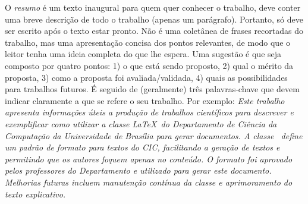 O \emph{resumo} é um texto inaugural para quem quer conhecer o trabalho, deve conter
uma breve descrição de todo o trabalho (apenas um parágrafo). Portanto, só deve
ser escrito após o texto estar pronto. Não é uma coletânea de frases recortadas
do trabalho, mas uma apresentação concisa dos pontos relevantes, de modo que o
leitor tenha uma ideia completa do que lhe espera. Uma sugestão é que seja composto
por quatro pontos: 1) o que está sendo proposto, 2) qual o mérito da proposta, 3)
como a proposta foi avaliada/validada, 4) quais as possibilidades para trabalhos
futuros. É seguido de (geralmente) três palavras-chave que devem indicar claramente a que se
refere o seu trabalho. Por exemplo: \emph{Este trabalho apresenta informações úteis a produção de trabalhos
científicos para descrever e exemplificar como utilizar a classe \LaTeX\ do
Departamento de Ciência da Computação da Universidade de Brasília para gerar
documentos. A classe \unbcic\ define um padrão de formato para textos do CIC, facilitando a
geração de textos e permitindo que os autores foquem apenas no conteúdo. O formato
foi aprovado pelos professores do Departamento e utilizado para gerar este documento.
Melhorias futuras incluem manutenção contínua da classe e aprimoramento do texto
explicativo.}